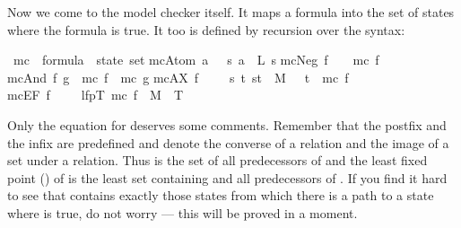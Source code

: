 \begin{isabellebody}
\begin{isamarkuptext}
Now we come to the model checker itself. It maps a formula into the set of
states where the formula is true.  It too is defined by recursion over the syntax:%
\end{isamarkuptext}%
\isamarkuptrue%
\isamarkupfalse%
\ mc\ {\isacharcolon}{\isacharcolon}\ {\isachardoublequoteopen}formula\ {\isasymRightarrow}\ state\ set{\isachardoublequoteclose}\isanewline
{}\isamarkupfalse%
\isanewline
{\isachardoublequoteopen}mc{\isacharparenleft}Atom\ a{\isacharparenright}\ \ {\isacharequal}\ {\isacharbraceleft}s{\isachardot}\ a\ {\isasymin}\ L\ s{\isacharbraceright}{\isachardoublequoteclose}\isanewline
{\isachardoublequoteopen}mc{\isacharparenleft}Neg\ f{\isacharparenright}\ \ \ {\isacharequal}\ {\isacharminus}mc\ f{\isachardoublequoteclose}\isanewline
{\isachardoublequoteopen}mc{\isacharparenleft}And\ f\ g{\isacharparenright}\ {\isacharequal}\ mc\ f\ {\isasyminter}\ mc\ g{\isachardoublequoteclose}\isanewline
{\isachardoublequoteopen}mc{\isacharparenleft}AX\ f{\isacharparenright}\ \ \ \ {\isacharequal}\ {\isacharbraceleft}s{\isachardot}\ {\isasymforall}t{\isachardot}\ {\isacharparenleft}s{\isacharcomma}t{\isacharparenright}\ {\isasymin}\ M\ \ {\isasymlongrightarrow}\ t\ {\isasymin}\ mc\ f{\isacharbraceright}{\isachardoublequoteclose}\isanewline
{\isachardoublequoteopen}mc{\isacharparenleft}EF\ f{\isacharparenright}\ \ \ \ {\isacharequal}\ lfp{\isacharparenleft}{\isasymlambda}T{\isachardot}\ mc\ f\ {\isasymunion}\ {\isacharparenleft}M{\isasyminverse}\ {\isacharbackquote}{\isacharbackquote}\ T{\isacharparenright}{\isacharparenright}{\isachardoublequoteclose}%
\begin{isamarkuptext}%
\noindent
Only the equation for  deserves some comments. Remember that the
postfix \isa{{\isasyminverse}} and the infix \isa{{\isacharbackquote}{\isacharbackquote}} are predefined and denote the
converse of a relation and the image of a set under a relation.  Thus
 is the set of all predecessors of  and the least
fixed point () of  is the least set
 containing  and all predecessors of . If you
find it hard to see that  contains exactly those states from
which there is a path to a state where  is true, do not worry --- this
will be proved in a moment.


\end{isamarkuptext}
\end{isabellebody}
